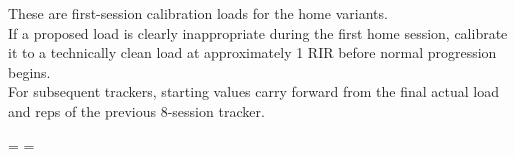 \documentclass[11pt,a4paper]{article}
\begin{document}
\vspace{0.48cm}
{\fontsize{8.15}{9.8}\selectfont\color{muted}
These are first-session calibration loads for the home variants.\\[0.13cm]
If a proposed load is clearly inappropriate during the first home session, calibrate it to a technically clean load at approximately 1 RIR before normal progression begins.\\[0.13cm]
For subsequent trackers, starting values carry forward from the final actual load and reps of the previous 8-session tracker.
}

\clearpage
\setlength{\paperwidth}{297mm}
\setlength{\paperheight}{210mm}
\pdfpagewidth=\paperwidth
\pdfpageheight=\paperheight
{}
\setlength{\textwidth}{281mm}
\setlength{\linewidth}{281mm}
\setlength{\columnwidth}{281mm}
\hsize=281mm
\setlength{\tabcolsep}{0pt}
\renewcommand{\arraystretch}{1}
\setlength{\arrayrulewidth}{0.45pt}

\newcommand{\SessionHead}[1]{\multicolumn{4}{c|}{\cellcolor{headfill}\rule{0pt}{4.05mm}\textbf{\fontsize{7.5}{8.2}\selectfont S#1}}}
\newcommand{\SessionSubHead}{\cellcolor{headfill}\rule{0pt}{4.05mm}\textbf{\fontsize{5.7}{6.2}\selectfont kg} & \multicolumn{3}{c|}{\cellcolor{headfill}\rule{0pt}{4.05mm}\textbf{\fontsize{5.7}{6.2}\selectfont plan}}}
\newcommand{\SessionActualHead}{\cellcolor{headfill}\rule{0pt}{4.05mm} & \multicolumn{3}{c|}{\cellcolor{headfill}\rule{0pt}{4.05mm}\textbf{\fontsize{5.7}{6.2}\selectfont actual}}}
\end{document}
